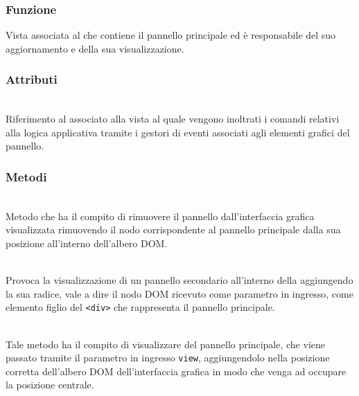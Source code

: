 \subsubsection*{Funzione}
Vista associata al  che contiene il pannello principale ed è responsabile del suo aggiornamento e della sua visualizzazione.

\subsubsection*{Attributi}
\begin{description}
  \item{}\\
  Riferimento al  associato alla vista al quale vengono inoltrati i comandi relativi alla logica applicativa tramite i gestori di eventi associati agli elementi grafici del pannello.
\end{description}

\subsubsection*{Metodi}
\begin{description}
  \item{}\\
  Metodo che ha il compito di rimuovere il pannello dall'interfaccia grafica visualizzata rimuovendo il nodo corrispondente al pannello principale dalla sua posizione all'interno dell'albero DOM\@.
  
  \item{}\\
  Provoca la visualizzazione di un pannello secondario all'interno della  aggiungendo la sua radice, vale a dire il nodo DOM ricevuto come parametro in ingresso, come elemento figlio del \verb'<div>' che rappresenta il pannello principale.

  \item{}\\
  Tale metodo ha il compito di visualizzare del pannello principale, che viene passato tramite il parametro in ingresso \verb'view', aggiungendolo nella posizione corretta dell'albero DOM dell'interfaccia grafica in modo che venga ad occupare la posizione centrale.
  
\end{description}

